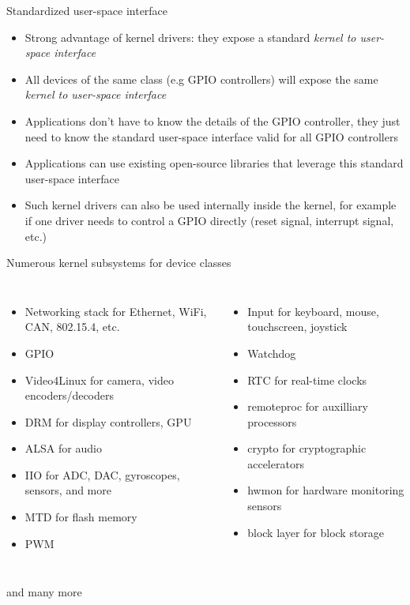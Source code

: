 \begin{frame}{Standardized user-space interface}
  \begin{itemize}
  \item Strong advantage of kernel drivers: they expose a standard
    {\em kernel to user-space interface}
  \item All devices of the same class (e.g GPIO controllers) will
    expose the same {\em kernel to user-space interface}
  \item Applications don't have to know the details of the GPIO
    controller, they just need to know the standard user-space
    interface valid for all GPIO controllers
  \item Applications can use existing open-source libraries that
    leverage this standard user-space interface
  \item Such kernel drivers can also be used internally inside the
    kernel, for example if one driver needs to control a GPIO directly
    (reset signal, interrupt signal, etc.)
  \end{itemize}
\end{frame}

\begin{frame}{Numerous kernel subsystems for device classes}
  \begin{columns}
    \begin{itemize}
    \item Networking stack for Ethernet, WiFi, CAN, 802.15.4, etc.
    \item GPIO
    \item Video4Linux for camera, video encoders/decoders
    \item DRM for display controllers, GPU
    \item ALSA for audio
    \item IIO for ADC, DAC, gyroscopes, sensors, and more
    \item MTD for flash memory
    \item PWM
    \end{itemize}
    \begin{itemize}
    \item Input for keyboard, mouse, touchscreen, joystick
    \item Watchdog
    \item RTC for real-time clocks
    \item remoteproc for auxilliary processors
    \item crypto for cryptographic accelerators
    \item hwmon for hardware monitoring sensors
    \item block layer for block storage
    \end{itemize}
  \end{columns}
  \begin{center}
    and many more
  \end{center}
\end{frame}

